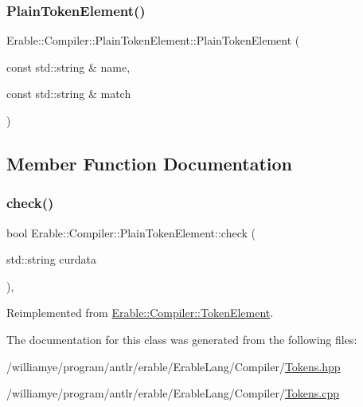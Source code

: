 \subsubsection{\texorpdfstring{PlainTokenElement()}{PlainTokenElement()}}
{\footnotesize\ttfamily Erable\+::\+Compiler\+::\+Plain\+Token\+Element\+::\+Plain\+Token\+Element (\begin{DoxyParamCaption}\item[{const std\+::string \&}]{name,  }\item[{const std\+::string \&}]{match }\end{DoxyParamCaption})}



\subsection{Member Function Documentation}
\mbox{\label{class_erable_1_1_compiler_1_1_plain_token_element_a84f12d7d773c70712b30827eae60caed}} 
\subsubsection{\texorpdfstring{check()}{check()}}
{\footnotesize\ttfamily bool Erable\+::\+Compiler\+::\+Plain\+Token\+Element\+::check (\begin{DoxyParamCaption}\item[{std\+::string}]{curdata }\end{DoxyParamCaption})\hspace{0.3cm}{\ttfamily [override]}, {\ttfamily [virtual]}}



Reimplemented from \mbox{\hyperlink{class_erable_1_1_compiler_1_1_token_element_a939f70ed141904d769b6d9f6ecf39cb1}{Erable\+::\+Compiler\+::\+Token\+Element}}.



The documentation for this class was generated from the following files\+:\begin{DoxyCompactItemize}
\item 
/williamye/program/antlr/erable/\+Erable\+Lang/\+Compiler/\mbox{\hyperlink{_tokens_8hpp}{Tokens.\+hpp}}\item 
/williamye/program/antlr/erable/\+Erable\+Lang/\+Compiler/\mbox{\hyperlink{_tokens_8cpp}{Tokens.\+cpp}}\end{DoxyCompactItemize}
